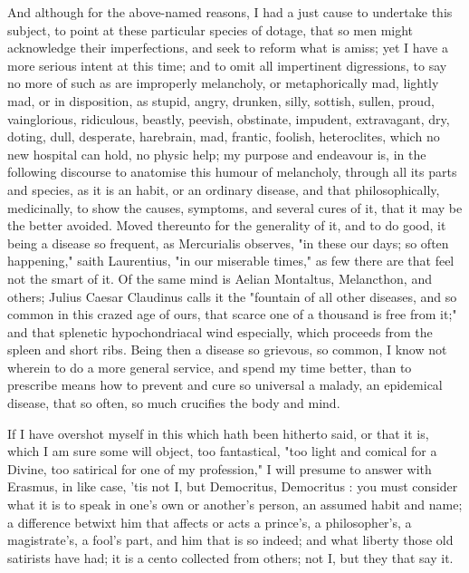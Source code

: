 And although for the above-named reasons, I had a just cause to undertake this
subject, to point at these particular species of dotage, that so men might
acknowledge their imperfections, and seek to reform what is amiss; yet I have a
more serious intent at this time; and to omit all impertinent digressions, to
say no more of such as are improperly melancholy, or metaphorically mad,
lightly mad, or in disposition, as stupid, angry, drunken, silly, sottish,
sullen, proud, vainglorious, ridiculous, beastly, peevish, obstinate, impudent,
extravagant, dry, doting, dull, desperate, harebrain, \etc{} mad, frantic,
foolish, heteroclites, which no new hospital can hold, no
physic help; my purpose and endeavour is, in the following discourse to
anatomise this humour of melancholy, through all its parts and species, as it
is an habit, or an ordinary disease, and that philosophically, medicinally, to
show the causes, symptoms, and several cures of it, that it may be the better
avoided. Moved thereunto for the generality of it, and to do good, it being a
disease so frequent, as Mercurialis observes, "in these our
days; so often happening," saith Laurentius, "in our
miserable times," as few there are that feel not the smart of it. Of the same
mind is Aelian Montaltus, Melancthon, and others;
Julius Caesar Claudinus calls it the "fountain of all other
diseases, and so common in this crazed age of ours, that scarce one of a
thousand is free from it;" and that splenetic hypochondriacal wind especially,
which proceeds from the spleen and short ribs. Being then a disease so
grievous, so common, I know not wherein to do a more general service, and spend
my time better, than to prescribe means how to prevent and cure so universal a
malady, an epidemical disease, that so often, so much crucifies the body and
mind.

If I have overshot myself in this which hath been hitherto said, or that it is,
which I am sure some will object, too fantastical, "too light and comical for a
Divine, too satirical for one of my profession," I will presume to answer with
Erasmus, in like case, 'tis not I, but Democritus,
Democritus : you must consider what it is to speak in one's own or
another's person, an assumed habit and name; a difference betwixt him that
affects or acts a prince's, a philosopher's, a magistrate's, a fool's part, and
him that is so indeed; and what liberty those old satirists have had; it is a
cento collected from others; not I, but they that say it.

